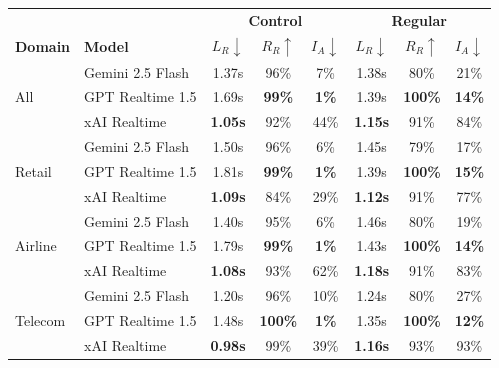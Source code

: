 \begin{tabular}{@{}ll|ccc|ccc@{}}
\toprule
 & & \multicolumn{3}{c|}{\textbf{Control}} & \multicolumn{3}{c}{\textbf{Regular}} \\
\textbf{Domain} & \textbf{Model} & $L_R\downarrow$ & $R_R\uparrow$ & $I_A\downarrow$ & $L_R\downarrow$ & $R_R\uparrow$ & $I_A\downarrow$ \\
\midrule
\multirow{3}{*}{All} & Gemini 2.5 Flash & 1.37s & 96\% & 7\% & 1.38s & 80\% & 21\% \\
 & GPT Realtime 1.5 & 1.69s & \textbf{99\%} & \textbf{1\%} & 1.39s & \textbf{100\%} & \textbf{14\%} \\
 & xAI Realtime & \textbf{1.05s} & 92\% & 44\% & \textbf{1.15s} & 91\% & 84\% \\
\midrule
\multirow{3}{*}{Retail} & Gemini 2.5 Flash & 1.50s & 96\% & 6\% & 1.45s & 79\% & 17\% \\
 & GPT Realtime 1.5 & 1.81s & \textbf{99\%} & \textbf{1\%} & 1.39s & \textbf{100\%} & \textbf{15\%} \\
 & xAI Realtime & \textbf{1.09s} & 84\% & 29\% & \textbf{1.12s} & 91\% & 77\% \\
\midrule
\multirow{3}{*}{Airline} & Gemini 2.5 Flash & 1.40s & 95\% & 6\% & 1.46s & 80\% & 19\% \\
 & GPT Realtime 1.5 & 1.79s & \textbf{99\%} & \textbf{1\%} & 1.43s & \textbf{100\%} & \textbf{14\%} \\
 & xAI Realtime & \textbf{1.08s} & 93\% & 62\% & \textbf{1.18s} & 91\% & 83\% \\
\midrule
\multirow{3}{*}{Telecom} & Gemini 2.5 Flash & 1.20s & 96\% & 10\% & 1.24s & 80\% & 27\% \\
 & GPT Realtime 1.5 & 1.48s & \textbf{100\%} & \textbf{1\%} & 1.35s & \textbf{100\%} & \textbf{12\%} \\
 & xAI Realtime & \textbf{0.98s} & 99\% & 39\% & \textbf{1.16s} & 93\% & 93\% \\
\bottomrule
\end{tabular}